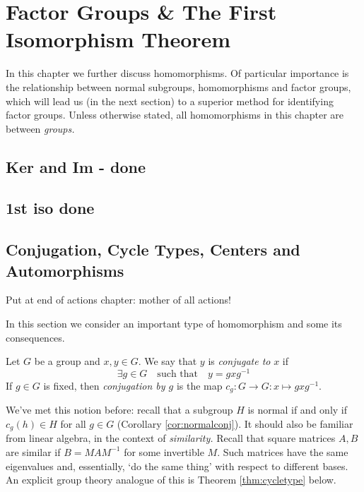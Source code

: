 \graphicspath{{6homo/asy/}}
\setcounter{section}{5}

\section{Factor Groups \& The First Isomorphism Theorem}\label{chap:homo}

In this chapter we further discuss homomorphisms. Of particular importance is the relationship between normal subgroups, homomorphisms and factor groups, which will lead us (in the next section) to a superior method for identifying factor groups.\smallbreak
Unless otherwise stated, all homomorphisms in this chapter are between \emph{groups.}

\subsection{Ker and Im - done}



\clearpage

\subsection{1st iso done}


\subsection{Conjugation, Cycle Types, Centers and Automorphisms}\label{sec:conj}

Put at end of actions chapter: mother of all actions!

In this section we consider an important type of homomorphism and some its consequences.

\begin{defn}{}{}
	Let $G$ be a group and $x,y\in G$. We say that $y$ is \emph{conjugate to} $x$ if
	\[
		\exists g\in G\quad\text{such that}\quad y=gx g^{-1}
	\]
	If $g\in G$ is fixed, then \emph{conjugation by $g$} is the map $c_g:G\to G:x\mapsto gx g^{-1}$.
\end{defn}

We've met this notion before: recall that a subgroup $H$ is normal if and only if $c_g(h)\in H$ for all $g\in G$ (Corollary \ref{cor:normalconj}). It should also be familiar from linear algebra, in the context of \emph{similarity.} Recall that square matrices $A,B$ are similar if $B=MAM^{-1}$ for some invertible $M$. Such matrices have the same eigenvalues and, essentially, `do the same thing' with respect to different bases. An explicit group theory analogue of this is Theorem \ref{thm:cycletype} below.


